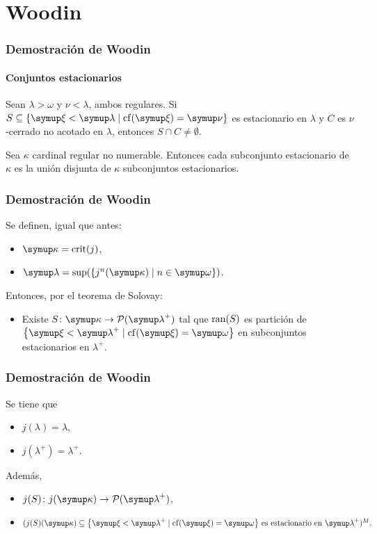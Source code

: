 \documentclass{beamer}
\begin{document}
\section{Woodin}

\begin{frame}
    \frametitle{Demostración de Woodin}
    \framesubtitle{Conjuntos estacionarios}

    \pause
    \begin{teo}
    Sean $\lambda>\omega$ y $\nu<\lambda$, ambos regulares.
    Si $S\subseteq\set{\xi<\lambda\mid \cf(\xi)=\nu}$ es estacionario en $\lambda$
    y $C$ es $\nu$-cerrado no acotado en $\lambda$, entonces $S\cap C\neq\emptyset$.
    \end{teo}

    \bigskip

    \pause
    \begin{teo}[Solovay]
    Sea $\kappa$ cardinal regular no numerable. Entonces cada subconjunto estacionario
    de $\kappa$ es la unión disjunta de $\kappa$ subconjuntos estacionarios.
    \end{teo}
\end{frame}

\begin{frame}
    \frametitle{Demostración de Woodin}

    Se definen, igual que antes:
    \begin{itemize}
        \item $\kappa=\crit{j}$,
        \item $\lambda=\sup(\set{j^n(\kappa)\mid n\in\omega})$.
    \end{itemize}

    \pause
    Entonces, por el teorema de Solovay:
    \begin{itemize}
    \item Existe $S\colon\kappa\to\pwset{\lambda^+}$ tal que $\operatorname{ran}(S)$ es
        partición de $\set{\xi < \lambda^+\mid \cf(\xi) = \omega}$ en subconjuntos
        estacionarios en $\lambda^+$.
    \end{itemize}
\end{frame}

\begin{frame}
    \frametitle{Demostración de Woodin}
    Se tiene que
    \begin{itemize}
        \item $j(\lambda) = \lambda$,
        \item $j(\lambda^+) = \lambda^+$.
    \end{itemize}

    \pause
    Además,
    \begin{itemize}
        \item $j(S)\colon j(\kappa)\to\pwset{\lambda^+}$,
        \item $(
            j(S)(\kappa)\subseteq\set{\xi < \lambda^+\mid \cf(\xi) = \omega}
            \,\text{es estacionario en $\lambda^+$}
        )^M.$
    \end{itemize}
\end{frame}
\end{document}
